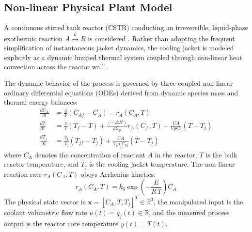 
\subsection{Non-linear Physical Plant Model}
A continuous stirred tank reactor (CSTR) conducting an irreversible, liquid-phase exothermic reaction $A \xrightarrow{k} B$ is considered \cite{luyben2007chemical, seborg2010process}. Rather than adopting the frequent simplification of instantaneous jacket dynamics, the cooling jacket is modeled explicitly as a dynamic lumped thermal system coupled through non-linear heat convection across the reactor wall \cite{uppal1974dynamic}.

The dynamic behavior of the process is governed by three coupled non-linear ordinary differential equations (ODEs) derived from dynamic species mass and thermal energy balances:
\begin{align}
    \frac{dC_A}{dt} &= \frac{q}{V}(C_{Af} - C_A) - r_A(C_A, T) \label{eq:cstr_ca} \\
    \frac{dT}{dt}   &= \frac{q}{V}(T_f - T) + \frac{(-\Delta H)}{\rho C_p} r_A(C_A, T) - \frac{UA}{V \rho C_p}(T - T_j) \label{eq:cstr_t} \\
    \frac{dT_j}{dt} &= \frac{q_j}{V_j}(T_{jf} - T_j) + \frac{UA}{V_j \rho_j C_{pj}}(T - T_j) \label{eq:cstr_tj}
\end{align}
where $C_A$ denotes the concentration of reactant $A$ in the reactor, $T$ is the bulk reactor temperature, and $T_j$ is the cooling jacket temperature. The non-linear reaction rate $r_A(C_A, T)$ obeys Arrhenius kinetics:
\begin{equation}
    r_A(C_A, T) = k_0 \exp\left(-\frac{E}{R\,T}\right) C_A
    \label{eq:arrhenius}
\end{equation}
The physical state vector is $\mathbf{x} = [C_A, T, T_j]^T \in \mathbb{R}^3$, the manipulated input is the coolant volumetric flow rate $u(t) = q_j(t) \in \mathbb{R}$, and the measured process output is the reactor core temperature $y(t) = T(t)$.

